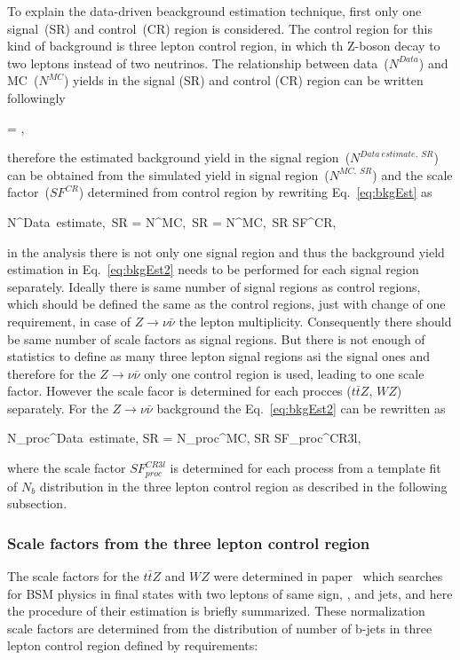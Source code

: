   
To explain the data-driven beackground estimation technique, first only one signal~(SR) and control~(CR) region is considered. The control region for this kind of background is three lepton control region, in which th Z-boson decay to two leptons instead of two neutrinos. The relationship between data~($N^{Data}$) and MC~($N^{MC}$) yields in the signal (SR) and control (CR) region can be written followingly

{
  = ,
}

therefore the estimated background yield in the signal region~($N^{Data~estimate,~SR}$) can be obtained from the simulated yield in signal region~($N^{MC,~SR}$) and the scale factor~($SF^{CR}$) determined from control region by rewriting Eq.~\ref{eq:bkgEst} as

{
N^{Data~estimate,~SR}  = N^{MC,~SR} \times  {} = N^{MC,~SR} \times  SF^{CR},
}

in the analysis there is not only one signal region and thus the background yield estimation in Eq.~\ref{eq:bkgEst2} needs to be performed for each signal region separately. Ideally there is same number of signal regions as control regions, which should be defined the same as the control regions, just with change of one requirement, in case of $Z \to \nu \bar{\nu}$ the lepton multiplicity. Consequently there should be same number of scale factors as signal regions.  But there is not enough of statistics to define as many three lepton signal regions asi the signal ones and therefore for the $Z \to \nu \bar{\nu}$ only one control region is used, leading to one scale factor. However the scale facor is determined for each procces ($t\bar{t}Z$, $WZ$) separately. For the $Z \to \nu \bar{\nu}$ background the Eq.~\ref{eq:bkgEst2} can be rewritten as

{
N_{proc}^{Data~estimate, SR}  = N_{proc}^{MC, SR} \times SF_{proc}^{CR3l},
}

where the scale factor $SF_{proc}^{CR3l}$ is determined for each process from a template fit of $N_{b}$ distribution in the three lepton control region as described in the following subsection.

\subsubsection{Scale factors from the three lepton control region}


The scale factors for the $t\bar{t}Z$ and  $WZ$ were determined in paper~\cite{Sirunyan:2017uyt} which searches for BSM physics in final states with two leptons of same sign, \MET, and jets, and here the procedure of their estimation is briefly summarized. These normalization scale factors are determined from the distribution of number of b-jets in three lepton control region defined by requirements:

